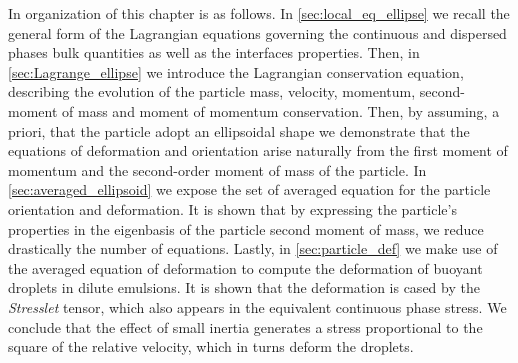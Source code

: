 In organization of this chapter is as follows. 
In \ref{sec:local_eq_ellipse} we recall the general form of the Lagrangian equations governing the continuous and dispersed phases bulk quantities as well as the interfaces properties.
Then, in \ref{sec:Lagrange_ellipse} we introduce the Lagrangian conservation equation, describing the evolution of the particle mass, velocity, momentum, second-moment of mass and moment of momentum conservation. 
Then, by assuming, a priori, that the particle adopt an ellipsoidal shape we demonstrate that the equations of deformation and orientation arise naturally from the first moment of momentum and the second-order moment of mass of the particle.
In \ref{sec:averaged_ellipsoid} we expose the set of averaged equation for the particle orientation and deformation. 
It is shown that by expressing the particle's properties in the eigenbasis of the particle second moment of mass, we reduce drastically the number of equations. 
Lastly, in \ref{sec:particle_def} we make use of the averaged equation of deformation to compute the deformation of buoyant droplets in dilute emulsions. 
It is shown that the deformation is cased by the \textit{Stresslet} tensor, which also appears in the equivalent continuous phase stress.
We conclude that the effect of small inertia generates a stress proportional to the square of the relative velocity, which in turns deform the droplets. 

